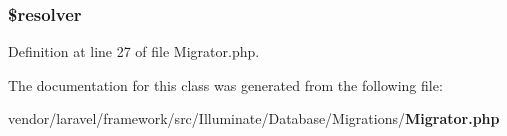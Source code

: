 \subsubsection[{\$resolver}]{\setlength{\rightskip}{0pt plus 5cm}\$resolver\hspace{0.3cm}{\ttfamily [protected]}}\label{class_illuminate_1_1_database_1_1_migrations_1_1_migrator_a7135f2410a6688dad5c96ff68827d911}


Definition at line 27 of file Migrator.\+php.



The documentation for this class was generated from the following file\+:\begin{DoxyCompactItemize}
\item 
vendor/laravel/framework/src/\+Illuminate/\+Database/\+Migrations/{\bf Migrator.\+php}\end{DoxyCompactItemize}

